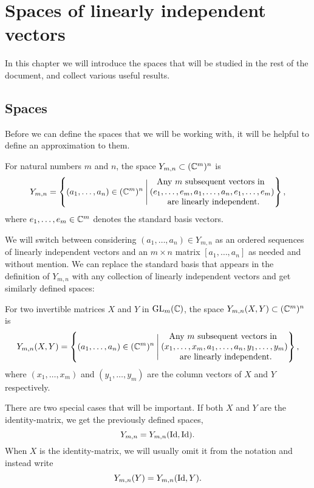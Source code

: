 \chapter{Spaces of linearly independent vectors}
\label{chap:rum}

In this chapter we will introduce the spaces that will be studied in
the rest of the document, and collect various useful
results.

\section{Spaces} 
\label{sec:rum}
Before we can define the spaces that we will be working with, it will
be helpful to define an approximation to them.

\begin{definition} 
  For natural numbers $m$ and $n$, the space $Y_{m,n}\subset
  (\mathbb{C}^{m})^{n}$ is
  \[ Y_{m,n} = \left\{ (a_1,\dots,a_n) \in (\mathbb{C}^m)^n \:\Bigg\vert\:
    \begin{matrix}
      \text{Any } m \text{ subsequent vectors in } \\
      (e_1,\dots,e_m,a_1,\dots,a_n,e_1,\dots,e_m) \\
      \text{ are linearly independent.}
    \end{matrix}  \right\}, \]
  where $e_1,\dots,e_m \in \mathbb{C}^m$ denotes the standard basis
  vectors.
\end{definition}

We will switch between considering $(a_1,\dots,a_n)\in Y_{m,n}$ as an
ordered sequences of linearly independent vectors and an $m\times n$
matrix $[a_1,\dots,a_n]$ as needed and without mention. We can replace
the standard basis that appears in the definition of $Y_{m,n}$ with
any collection of linearly independent vectors and get similarly
defined spaces: 
\begin{definition}
  \label{def:rum}
  For two invertible matrices $X$ and $Y$ in
  $\operatorname{GL}_m(\mathbb{C})$, the space \newline
  $Y_{m,n}(X,Y) \subset (\mathbb{C}^{m})^{n}$ is
  \[ Y_{m,n}(X,Y) = \left\{ (a_1,\dots,a_n) \in (\mathbb{C}^m)^n
    \:\Bigg\vert\: 
    \begin{matrix}
      \text{Any } m \text{ subsequent vectors in } \\
      (x_1,\dots,x_m,a_1,\dots,a_n,y_1,\dots,y_m) \\
      \text{ are linearly independent.}
    \end{matrix}  \right\}, \]
  where $(x_1,\dots,x_m)$ and $(y_1,\dots,y_m)$ are the column vectors
  of $X$ and $Y$ respectively.
  
  There are two special cases that will be important.
  If both $X$ and $Y$ are the identity-matrix, we get the previously
  defined spaces,
  \[ Y_{m,n} = Y_{m,n}(\operatorname{Id},\operatorname{Id}). \]
  When $X$ is the identity-matrix, we will usually omit it from the
  notation and instead write
  \[ Y_{m,n}(Y) = Y_{m,n}(\operatorname{Id},Y). \]
\end{definition}

